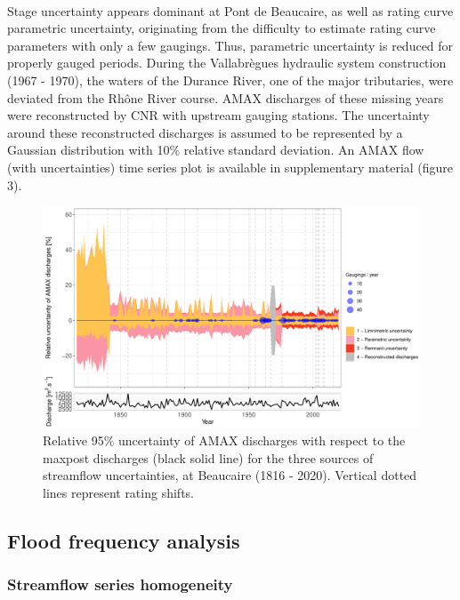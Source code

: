 \documentclass[11pt]{article}
\begin{document}
    \paragraph{} Stage uncertainty appears dominant at Pont de Beaucaire, as well as rating curve parametric uncertainty, originating from the difficulty to estimate rating curve parameters with only a few gaugings. Thus, parametric uncertainty is reduced for properly gauged periods. During the Vallabrègues hydraulic system construction (1967 - 1970), the waters of the Durance River, one of the major tributaries, were deviated from the Rhône River course. AMAX discharges of these missing years were reconstructed by CNR with upstream gauging stations. The uncertainty around these reconstructed discharges is assumed to be represented by a Gaussian distribution with 10\% relative standard deviation. An AMAX flow (with uncertainties) time series plot is available in supplementary material (figure 3).
    
    \begin{figure}[h!]
        \centering
        \includegraphics[width=\textwidth]{Figs/9-IcAndAMAX.pdf}
        \caption{Relative 95\% uncertainty of AMAX discharges with respect to the maxpost discharges (black solid line) for the three sources of streamflow uncertainties, at Beaucaire (1816 - 2020). Vertical dotted lines represent rating shifts.}
        \label{fig:ICtot_both}
    \end{figure}
    \FloatBarrier
   
    \subsection{Flood frequency analysis}
    
        \subsubsection{Streamflow series homogeneity}
           
\end{document}
